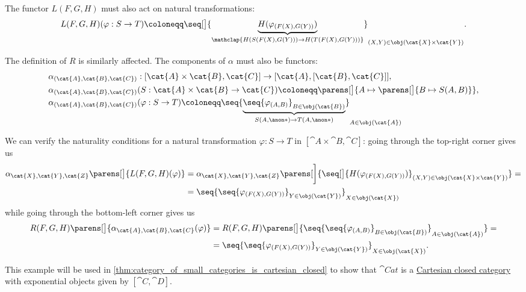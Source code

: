 \begin{example}
\begin{thmenum}
    The functor \( L(F, G, H) \) must also act on natural transformations:
    \begin{equation*}
      L(F, G, H)(\varphi: S \to T) \coloneqq \seq[\big]{ \underbrace{H(\varphi_{(F(X), G(Y))})}_{\mathclap{H(S(F(X), G(Y))) \to H(T(F(X), G(Y)))}} }_{(X, Y) \in \obj(\cat{X} \times \cat{Y}) }.
    \end{equation*}

    The definition of \( R \) is similarly affected. The components of \( \alpha \) must also be functors:
    \begin{equation*}
      \begin{aligned}
        &\alpha_{(\cat{A}, \cat{B}, \cat{C})}: [\cat{A} \times \cat{B}, \cat{C}] \to [\cat{A}, [\cat{B}, \cat{C}]], \\
        &\alpha_{(\cat{A}, \cat{B}, \cat{C})}(S: \cat{A} \times \cat{B} \to \cat{C}) \coloneqq \parens[\big]{ A \mapsto \parens[\big]{ B \mapsto S(A, B) } }, \\
        &\alpha_{(\cat{A}, \cat{B}, \cat{C})}(\varphi: S \to T) \coloneqq \seq{ \underbrace{\seq{ \varphi_{(A, B)} }_{B \in \obj(\cat{B}) }}_{S(A, \anon*) \to T(A, \anon*)} }_{A \in \obj(\cat{A})}
      \end{aligned}
    \end{equation*}

    We can verify the naturality conditions for a natural transformation \( \varphi: S \to T \) in \( [\cat{A} \times \cat{B}, \cat{C}] \): going through the top-right corner gives us
    \begin{align*}
      \alpha_{\cat{X},\cat{Y},\cat{Z}}\parens[\big]{ L(F, G, H)(\varphi) }
      &=
      \alpha_{\cat{X},\cat{Y},\cat{Z}}\parens[\bigg]{ \seq[\big]{ H(\varphi_{(F(X), G(Y))}) }_{(X, Y) \in \obj(\cat{X} \times \cat{Y})} }
      = \\ &=
      \seq{ \seq{ \varphi_{(F(X), G(Y))} }_{Y \in \obj(\cat{Y}) } }_{X \in \obj(\cat{X})}
    \end{align*}
    while going through the bottom-left corner gives us
    \begin{align*}
      R(F, G, H)\parens[\big]{ \alpha_{\cat{A},\cat{B},\cat{C}}(\varphi) }
      &=
      R(F, G, H)\parens[\big]{ \seq{ \seq{ \varphi_{(A, B)} }_{B \in \obj(\cat{B}) } }_{A \in \obj(\cat{A})} }
      = \\ &=
      \seq{ \seq{ \varphi_{(F(X), G(Y))} }_{Y \in \obj(\cat{Y}) } }_{X \in \obj(\cat{X})}.
    \end{align*}

    This example will be used in \cref{thm:category_of_small_categories_is_cartesian_closed} to show that \( \cat{Cat} \) is a \hyperref[def:cartesian_closed_category]{Cartesian closed category} with exponential objects given by \( [\cat{C}, \cat{D}] \).


\end{thmenum}
\end{example}
